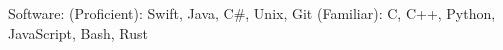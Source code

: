 





\vspace{-4mm}
  \cventry
    {} %
    {} %
    {} %
    {} %
    {
      \begin{cvitems} %
        \item {Software: (Proficient): Swift, Java, C\#, Unix, Git (Familiar): C, C++, Python, JavaScript, Bash, Rust}
      \end{cvitems}
    }


